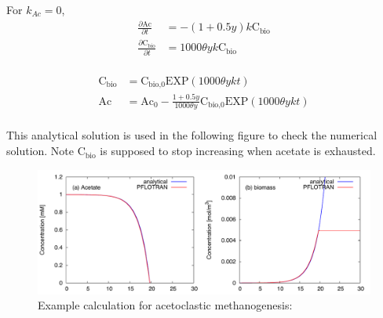 \documentclass[12pt, a4paper]{article}
\begin{document}
For  $k_{Ac} = 0$, 
\begin{align*}
\frac{\partial \text{Ac}}{\partial t} &= -(1 + 0.5y) k \text{C}_\text{bio} \\
\frac{\partial \text{C}_\text{bio}}{\partial t} &= 1000\theta y k \text{C}_\text{bio} \\
\end{align*}

\begin{align*}
\text{C}_\text{bio} &= \text{C}_\text{bio,0} \text{EXP}(1000\theta ykt) \\
\text{Ac} &= \text{Ac}_0 - \frac{1+0.5y}{1000\theta y}\text{C}_\text{bio,0} \text{EXP}(1000\theta ykt)  \\
\end{align*}

This analytical solution is used in the following figure to check the numerical solution. Note $\text{C}_\text{bio}$ is supposed to stop increasing when acetate is exhausted. 

\begin{figure}[h]
\centering
\includegraphics[width=1.0\textwidth]{../acemeg/fig.pdf}
\caption{Example calculation for acetoclastic methanogenesis: }
\label{Fig4}
\end{figure}



\clearpage


\end{document}
